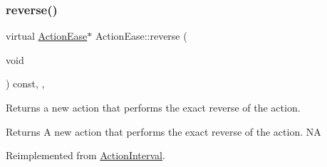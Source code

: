 \subsubsection{\texorpdfstring{reverse()}{reverse()}}
{\footnotesize\ttfamily virtual \hyperlink{classActionEase}{Action\+Ease}$\ast$ Action\+Ease\+::reverse (\begin{DoxyParamCaption}\item[{void}]{ }\end{DoxyParamCaption}) const\hspace{0.3cm}{\ttfamily [inline]}, {\ttfamily [override]}, {\ttfamily [virtual]}}

Returns a new action that performs the exact reverse of the action.

\begin{DoxyReturn}{Returns}
A new action that performs the exact reverse of the action.  NA 
\end{DoxyReturn}


Reimplemented from \hyperlink{classActionInterval_a9f9ac7164036a0bc261a72f62a2b2da7}{Action\+Interval}.



